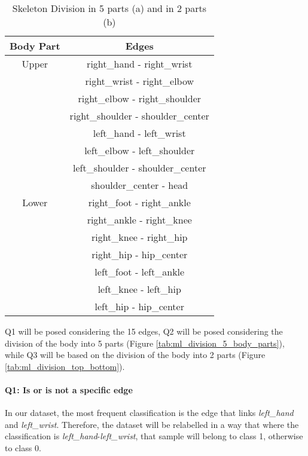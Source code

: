 \begin{table}[H]
    \begin{subtable}{\textwidth}
        \centering
        \begin{tabular}{||c||c||}
            \hline
            \textbf{Body Part} & \textbf{Edges} \\
            \hline
            Upper & right\_hand - right\_wrist \\
            & right\_wrist - right\_elbow \\
            & right\_elbow - right\_shoulder \\
            & right\_shoulder - shoulder\_center \\
            & left\_hand - left\_wrist \\
            & left\_elbow - left\_shoulder \\
            & left\_shoulder - shoulder\_center \\
            & shoulder\_center - head \\
            \hline
            Lower & right\_foot - right\_ankle \\
            & right\_ankle - right\_knee \\
            & right\_knee - right\_hip \\
            & right\_hip - hip\_center \\
            & left\_foot - left\_ankle \\
            & left\_knee - left\_hip \\
            & left\_hip - hip\_center \\
            \hline
        \end{tabular}
        \caption{}
        \label{tab:ml_division_top_bottom}
    \end{subtable}

    \caption{Skeleton Division in 5 parts (a) and in 2 parts (b)}
    \label{tab:ml_skeleton_divisions}
\end{table}

Q1 will be posed considering the 15 edges, Q2 will be posed considering the division of the body into 5 parts (Figure \ref{tab:ml_division_5_body_parts}), while Q3 will be based on the division of the body into 2 parts (Figure \ref{tab:ml_division_top_bottom}).

\paragraph{Q1: Is or is not a specific edge} In our dataset, the most frequent classification is the edge that links \textit{left\_hand} and \textit{left\_wrist}. 
Therefore, the dataset will be relabelled in a way that where the classification is \textit{left\_hand}-\textit{left\_wrist}, that sample will belong to class 1, otherwise to class 0.   
    
